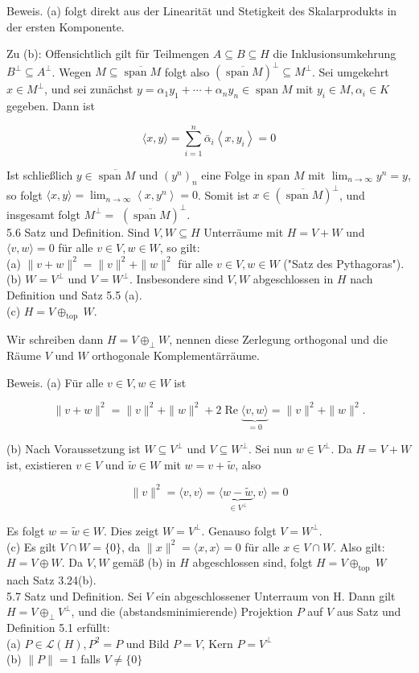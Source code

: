 \documentclass[10pt, letterpaper]{article}
\begin{document}
Beweis. (a) folgt direkt aus der Linearität und Stetigkeit des Skalarprodukts in der ersten Komponente.

Zu (b): Offensichtlich gilt für Teilmengen $A \subseteq B \subseteq H$ die Inklusionsumkehrung $B^{\perp} \subseteq A^{\perp}$. Wegen $M \subseteq \overline{\operatorname{span} M}$ folgt also $(\overline{\operatorname{span} M})^{\perp} \subseteq M^{\perp}$. Sei umgekehrt $x \in M^{\perp}$, und sei zunächst $y=\alpha_{1} y_{1}+\cdots+\alpha_{n} y_{n} \in \operatorname{span} M$ mit $y_{i} \in M, \alpha_{i} \in K$ gegeben. Dann ist

$$
\langle x, y\rangle=\sum_{i=1}^{n} \bar{\alpha}_{i}\left\langle x, y_{i}\right\rangle=0
$$

Ist schließlich $y \in \overline{\operatorname{span} M}$ und $\left(y^{n}\right)_{n}$ eine Folge in span $M$ mit $\lim _{n \rightarrow \infty} y^{n}=y$, so folgt $\langle x, y\rangle=\lim _{n \rightarrow \infty}\left\langle x, y^{n}\right\rangle=0$. Somit ist $x \in(\overline{\operatorname{span} M})^{\perp}$, und insgesamt folgt $M^{\perp}=$ $(\overline{\operatorname{span} M})^{\perp}$.\\
5.6 Satz und Definition. Sind $V, W \subseteq H$ Unterräume mit $H=V+W$ und $\langle v, w\rangle=0$ für alle $v \in V, w \in W$, so gilt:\\
(a) $\|v+w\|^{2}=\|v\|^{2}+\|w\|^{2}$ für alle $v \in V, w \in W$ ("Satz des Pythagoras").\\
(b) $W=V^{\perp}$ und $V=W^{\perp}$. Insbesondere sind $V, W$ abgeschlossen in $H$ nach Definition und Satz 5.5 (a).\\
(c) $H=V \oplus_{\text {top }} W$.

Wir schreiben dann $H=V \oplus_{\perp} W$, nennen diese Zerlegung orthogonal und die Räume $V$ und $W$ orthogonale Komplementärräume.

Beweis. (a) Für alle $v \in V, w \in W$ ist

$$
\|v+w\|^{2}=\|v\|^{2}+\|w\|^{2}+2 \operatorname{Re} \underbrace{\langle v, w\rangle}_{=0}=\|v\|^{2}+\|w\|^{2} .
$$

(b) Nach Voraussetzung ist $W \subseteq V^{\perp}$ und $V \subseteq W^{\perp}$. Sei nun $w \in V^{\perp}$. Da $H=V+W$ ist, existieren $v \in V$ und $\tilde{w} \in W$ mit $w=v+\tilde{w}$, also

$$
\|v\|^{2}=\langle v, v\rangle=\langle\underbrace{w-\tilde{w}}_{\in V^{\perp}}, v\rangle=0
$$

Es folgt $w=\tilde{w} \in W$. Dies zeigt $W=V^{\perp}$. Genauso folgt $V=W^{\perp}$.\\
(c) Es gilt $V \cap W=\{0\}$, da $\|x\|^{2}=\langle x, x\rangle=0$ für alle $x \in V \cap W$. Also gilt: $H=V \oplus W$. Da $V, W$ gemäß (b) in $H$ abgeschlossen sind, folgt $H=V \oplus_{\text {top }} W$ nach Satz 3.24(b).\\
5.7 Satz und Definition. Sei $V$ ein abgeschlossener Unterraum von H. Dann gilt $H=V \oplus_{\perp} V^{\perp}$, und die (abstandsminimierende) Projektion $P$ auf $V$ aus Satz und Definition 5.1 erfüllt:\\
(a) $P \in \mathcal{L}(H), P^{2}=P$ und Bild $P=V$, Kern $P=V^{\perp}$\\
(b) $\|P\|=1$ falls $V \neq\{0\}$
\end{document}
